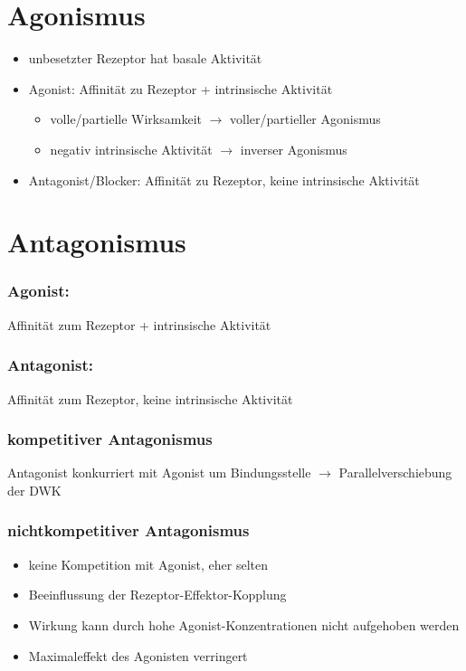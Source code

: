 \documentclass[10pt,a4paper]{report}
\begin{document}
\section{Agonismus}
\begin{itemize}
 \item unbesetzter Rezeptor hat basale Aktivität
	\item Agonist: Affinität zu Rezeptor + intrinsische Aktivität 
		\begin{itemize}
		\item	volle/partielle Wirksamkeit $\rightarrow$ voller/partieller Agonismus
		\item negativ intrinsische Aktivität $\rightarrow$ inverser Agonismus
		\end{itemize}	
	\item Antagonist/Blocker: Affinität zu Rezeptor, keine intrinsische Aktivität	
\end{itemize}
\section{Antagonismus}
\subsubsection{Agonist:}Affinität zum Rezeptor
+ intrinsische Aktivität
\subsubsection{Antagonist:} Affinität zum Rezeptor, 
keine intrinsische Aktivität
\subsubsection{kompetitiver Antagonismus} Antagonist konkurriert mit Agonist um 
Bindungsstelle $\rightarrow$ Parallelverschiebung der DWK
\subsubsection{nichtkompetitiver Antagonismus}
\begin{itemize}
	\item keine Kompetition mit Agonist, eher selten
	\item Beeinflussung der Rezeptor-Effektor-Kopplung
	\item Wirkung kann durch hohe Agonist-Konzentrationen nicht aufgehoben werden
	\item Maximaleffekt des Agonisten	verringert
\end{itemize}
\end{document}
